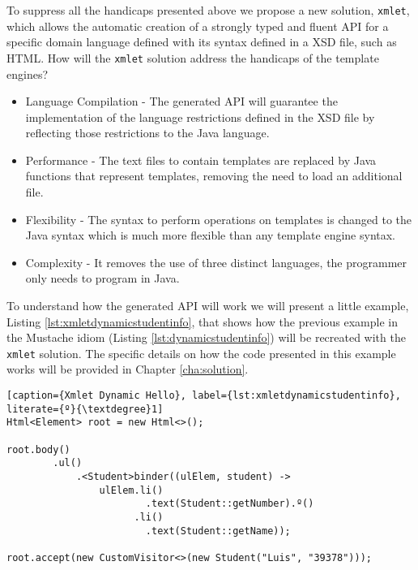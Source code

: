 \noindent
To suppress all the handicaps presented above we propose a new solution, \texttt{xmlet}, which allows the automatic creation of a strongly typed and fluent \ac{API} for a specific domain language defined with its syntax defined in a \ac{XSD} file, such as \ac{HTML}. How will the \texttt{xmlet} solution address the handicaps of the template engines?

\begin{itemize}
	\item Language Compilation - The generated \ac{API} will guarantee the implementation of the language restrictions defined in the \ac{XSD} file by reflecting those restrictions to the Java language.
	\item Performance - The text files to contain templates are replaced by Java functions that represent templates, removing the need to load an additional file.
	\item Flexibility - The syntax to perform operations on templates is changed to the Java syntax which is much more flexible than any template engine syntax.
	\item Complexity - It removes the use of three distinct languages, the programmer only needs to program in Java.
\end{itemize}

\noindent
To understand how the generated \ac{API} will work we will present a little example, Listing \ref{lst:xmletdynamicstudentinfo}, that shows how the previous example in the Mustache idiom (Listing \ref{lst:dynamicstudentinfo}) will be recreated with the \texttt{xmlet} solution. The specific details on how the code presented in this example works will be provided in Chapter \ref{cha:solution}.


\bigskip

\begin{minipage}{\linewidth}
\begin{lstlisting}[caption={Xmlet Dynamic Hello}, label={lst:xmletdynamicstudentinfo}, literate={º}{\textdegree}1]
Html<Element> root = new Html<>();

root.body()
        .ul()
            .<Student>binder((ulElem, student) ->
                ulElem.li()
                        .text(Student::getNumber).º()
                      .li()
                        .text(Student::getName));
        
root.accept(new CustomVisitor<>(new Student("Luis", "39378")));
\end{lstlisting}
\end{minipage} 

